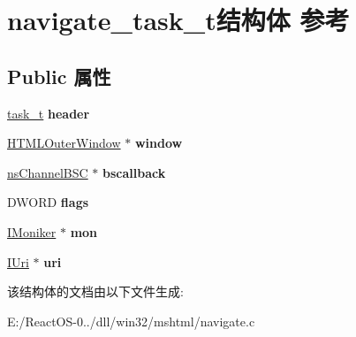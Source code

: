 \hypertarget{structnavigate__task__t}{}\section{navigate\+\_\+task\+\_\+t结构体 参考}
\label{structnavigate__task__t}
\subsection*{Public 属性}
\begin{DoxyCompactItemize}
\item 
\mbox{\label{structnavigate__task__t_ae680691c9438b5ee8703acd511d77714}} 
\hyperlink{structtask__t}{task\+\_\+t} {\bfseries header}
\item 
\mbox{\label{structnavigate__task__t_aa5a41d34c4edf036863d17ce7532d7a0}} 
\hyperlink{struct_h_t_m_l_outer_window}{H\+T\+M\+L\+Outer\+Window} $\ast$ {\bfseries window}
\item 
\mbox{\label{structnavigate__task__t_a5cd67ee42c8f260837d0e3dc2fdf9dcf}} 
\hyperlink{structns_channel_b_s_c}{ns\+Channel\+B\+SC} $\ast$ {\bfseries bscallback}
\item 
\mbox{\label{structnavigate__task__t_ad27b7faa3b773ddb70833aa8f2198e88}} 
D\+W\+O\+RD {\bfseries flags}
\item 
\mbox{\label{structnavigate__task__t_af5fe1b95f781fab484daf3312d31885b}} 
\hyperlink{interface_i_moniker}{I\+Moniker} $\ast$ {\bfseries mon}
\item 
\mbox{\label{structnavigate__task__t_a4e3401a50f8f11618d2855431ba1beca}} 
\hyperlink{interface_i_uri}{I\+Uri} $\ast$ {\bfseries uri}
\end{DoxyCompactItemize}


该结构体的文档由以下文件生成\+:\begin{DoxyCompactItemize}
\item 
E\+:/\+React\+O\+S-\/0../dll/win32/mshtml/navigate.\+c\end{DoxyCompactItemize}

